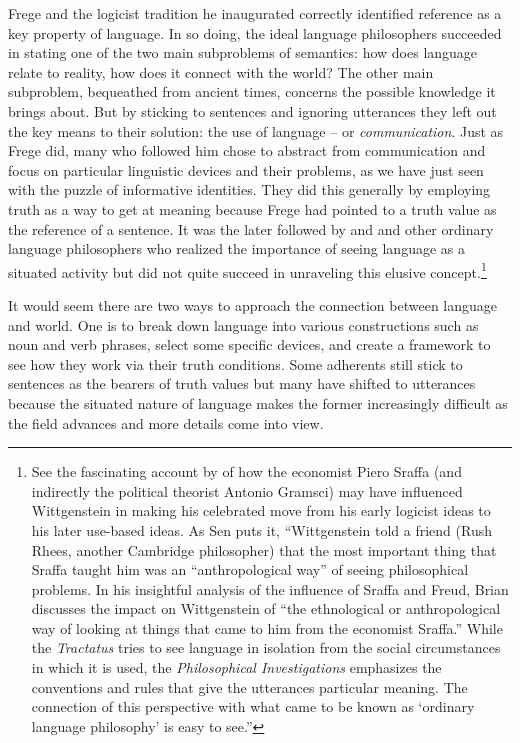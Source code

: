 Frege and the logicist tradition he inaugurated correctly identified reference as a key property of language. In so doing, the ideal language philosophers succeeded in stating one of the two main subproblems of semantics: how does language relate to reality, how does it connect with the world? The other main subproblem, bequeathed from ancient times, concerns the possible knowledge it brings about. But by sticking to sentences and ignoring utterances they left out the key means to their solution: the use of language -- or \emph{communication}. Just as Frege did, many who followed him chose to abstract from communication and focus on particular linguistic devices and their problems, as we have just seen with the puzzle of informative identities. They did this generally by employing truth as a way to get at meaning because Frege had pointed to a truth value as the reference of a sentence. It was the later \citet{wittgenstein:pi} followed by \citet{austin:pp, austin:htdtww} and \citet{grice:sitwow} and other ordinary language philosophers who realized the importance of seeing language as a situated activity but did not quite succeed in unraveling this elusive concept.\footnote{See the fascinating account by \citet{sen:swg} of how the economist Piero Sraffa (and indirectly the political theorist Antonio Gramsci) may have influenced Wittgenstein in making his celebrated move from his early logicist ideas to his later use-based ideas. As Sen puts it, ``Wittgenstein told a friend (Rush Rhees, another Cambridge philosopher) that the most important thing that Sraffa taught him was an ``anthropological way'' of seeing philosophical problems. In his insightful analysis of the influence of Sraffa and Freud, Brian \citet[36--39]{mcguinness:wt} discusses the impact on Wittgenstein of ``the ethnological or anthropological way of looking at things that came to him from the economist Sraffa.'' While the \emph{Tractatus} tries to see language in isolation from the social circumstances in which it is used, the \emph{Philosophical Investigations} emphasizes the conventions and rules that give the utterances particular meaning. The connection of this perspective with what came to be known as `ordinary language philosophy' is easy to see.''}

It would seem there are two ways to approach the connection between language and world. One is to break down language into various constructions such as noun and verb phrases, select some specific devices, and create a framework to see how they work via their truth conditions. Some adherents still stick to sentences as the bearers of truth values but many have shifted to utterances because the situated nature of language makes the former increasingly difficult as the field advances and more details come into view.\largerpage

